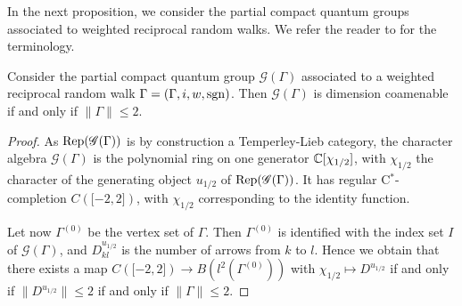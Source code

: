  
 In the next proposition, we consider the partial compact quantum groups associated to weighted reciprocal random walks. We refer the reader to \cite[Section 5]{DCT1} for the terminology.
  
 \begin{Prop} Consider the partial compact quantum group $\mathscr{G}(\Gamma)$ associated to a weighted reciprocal random walk $\Gamma = (\Gamma,i,w,\operatorname{\mathrm{sgn}})$. Then $\mathscr{G}(\Gamma)$ is dimension coamenable if and only if $\|\Gamma\| \leq 2$. 
 \end{Prop}%
 \begin{proof} As $\mathrm{Rep}(\mathscr{G}(\Gamma))$ is by construction a Temperley-Lieb category,  the character algebra $\mathscr{G}(\Gamma)$ is the polynomial ring on one generator $\mathbb{C}\lbrack \chi_{1/2}\rbrack$, with $\chi_{1/2}$ the character of the generating object $u_{1/2}$ of $\mathrm{Rep}(\mathscr{G}(\Gamma))$. It has regular C$^*$-completion $C(\lbrack -2,2\rbrack)$, with $\chi_{1/2}$ corresponding to the identity function. 
 
Let now $\Gamma^{(0)}$ be the vertex set of $\Gamma$. Then $\Gamma^{(0)}$ is identified with the index set $I$ of $\mathscr{G}(\Gamma)$, and $D^{u_{1/2}}_{kl}$ is the number of arrows from $k$ to $l$. Hence we obtain that there exists a map $C(\lbrack -2,2\rbrack) \rightarrow B(l^2(\Gamma^{(0)}))$ with $\chi_{1/2}\mapsto D^{u_{1/2}}$ if and only if $\|D^{u_{1/2}}\| \leq  2$ if and only if $\|\Gamma\|\leq 2$.   
 \end{proof} 
 
